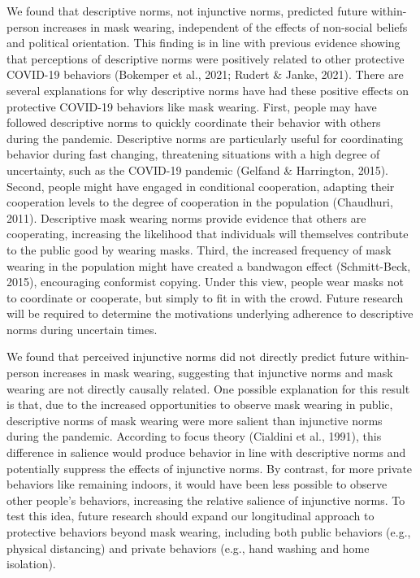 \documentclass[
  man, donotrepeattitle,mask,floatsintext]{apa6}
\begin{document}
We found that descriptive norms, not injunctive norms, predicted future within-person increases in mask wearing, independent of the effects of non-social beliefs and political orientation. This finding is in line with previous evidence showing that perceptions of descriptive norms were positively related to other protective COVID-19 behaviors (Bokemper et al., 2021; Rudert \& Janke, 2021). There are several explanations for why descriptive norms have had these positive effects on protective COVID-19 behaviors like mask wearing. First, people may have followed descriptive norms to quickly coordinate their behavior with others during the pandemic. Descriptive norms are particularly useful for coordinating behavior during fast changing, threatening situations with a high degree of uncertainty, such as the COVID-19 pandemic (Gelfand \& Harrington, 2015). Second, people might have engaged in conditional cooperation, adapting their cooperation levels to the degree of cooperation in the population (Chaudhuri, 2011). Descriptive mask wearing norms provide evidence that others are cooperating, increasing the likelihood that individuals will themselves contribute to the public good by wearing masks. Third, the increased frequency of mask wearing in the population might have created a bandwagon effect (Schmitt-Beck, 2015), encouraging conformist copying. Under this view, people wear masks not to coordinate or cooperate, but simply to fit in with the crowd. Future research will be required to determine the motivations underlying adherence to descriptive norms during uncertain times.

We found that perceived injunctive norms did not directly predict future within-person increases in mask wearing, suggesting that injunctive norms and mask wearing are not directly causally related. One possible explanation for this result is that, due to the increased opportunities to observe mask wearing in public, descriptive norms of mask wearing were more salient than injunctive norms during the pandemic. According to focus theory (Cialdini et al., 1991), this difference in salience would produce behavior in line with descriptive norms and potentially suppress the effects of injunctive norms. By contrast, for more private behaviors like remaining indoors, it would have been less possible to observe other people's behaviors, increasing the relative salience of injunctive norms. To test this idea, future research should expand our longitudinal approach to protective behaviors beyond mask wearing, including both public behaviors (e.g., physical distancing) and private behaviors (e.g., hand washing and home isolation).
\end{document}
